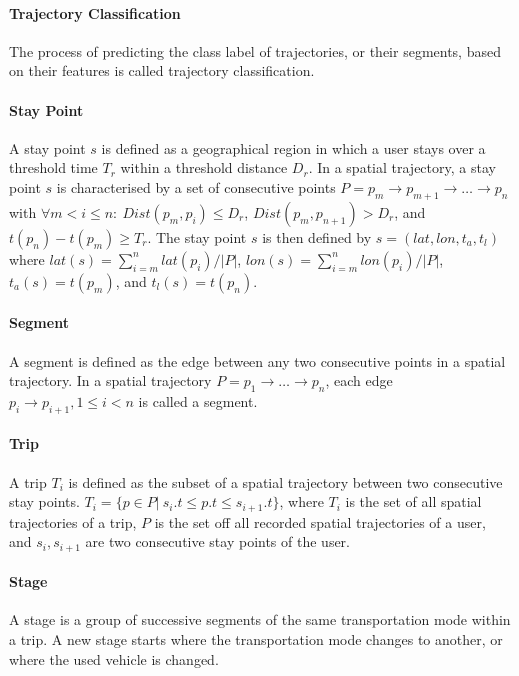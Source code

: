 \paragraph{Trajectory Classification} The process of predicting the class label of trajectories, or their segments, based on their features is called trajectory classification. \cite{lee2008traclass}

\paragraph{Stay Point} A stay point $s$ is defined as a geographical region in which a user stays over a threshold time $T_r$ within a threshold distance $D_r$. In a spatial trajectory, a stay point $s$ is characterised by a set of consecutive points $P=p_m \rightarrow p_{m+1} \rightarrow \dots \rightarrow p_n$ with $\forall m<i\leq n:\: Dist(p_m, p_i) \leq D_r$, $Dist(p_m, p_{n+1}) > D_r $, and $t(p_n) - t(p_m) \geq T_r$. The stay point $s$ is then defined by $s=(lat, lon, t_a, t_l)$ where $lat(s) = \sum^{n}_{i=m}lat(p_i) /|P|$, $lon(s) = \sum^{n}_{i=m}lon(p_i)/|P|$, $t_a(s) = t(p_m)$, and $t_l(s) = t(p_n)$. \cite{Zheng2007}

\paragraph{Segment} A segment is defined as the edge between any two consecutive points in a spatial trajectory. In a spatial trajectory $P=p_1 \rightarrow \dots \rightarrow p_n$, each edge $p_i\rightarrow p_{i+1}, 1\leq i < n$ is called a segment. \cite{Zheng:2015:TDM:2764959.2743025}

\paragraph{Trip} A trip $T_i$ is defined as the subset of a spatial trajectory between two consecutive stay points. $T_i = \{p \in P |\: s_i.t \leq p.t \leq s_{i+1}.t \}$, where $T_i$ is the set of all spatial trajectories of a trip, $P$ is the set off all recorded spatial trajectories of a user, and $s_i, s_{i+1}$ are two consecutive stay points of the user. \cite{Zheng2008}

\paragraph{Stage} A stage is a group of successive segments of the same transportation mode within a trip. A new stage starts where the transportation mode changes to another, or where the used vehicle is changed. \cite{Bolbol2012}

